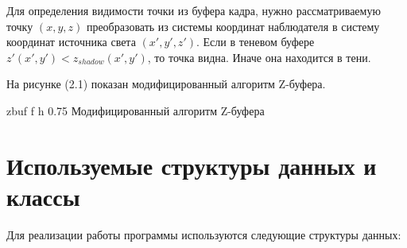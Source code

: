 Для определения видимости точки из буфера кадра, нужно рассматриваемую точку
$(x,y,z)$ преобразовать из системы координат наблюдателя в систему координат источника света $(x',y',z')$.
Если в теневом буфере $z'(x',y') < z_{shadow}(x',y')$, то
точка видна. Иначе она находится в тени.

На рисунке (2.1) показан модифицированный алгоритм Z-буфера.

{zbuf}
{f}
{h}
{0.75\textwidth}
{Модифицированный алгоритм Z-буфера}

\clearpage

\section{Используемые структуры данных и классы}

Для реализации работы программы используются следующие структуры данных:
